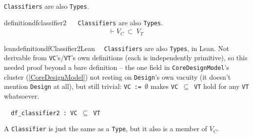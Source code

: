 \pn \texttt{Classifiers} are also \texttt{Types}.

\begin{restatable}{definition}{dfclassifier2} ~~  \texttt{Classifiers} are also \texttt{Types}.
\begin{align}
\vdash V_C~\subset~V_T~\label{eq:df-classifier2}\tag{df-classifier2}
\end{align}
\end{restatable}

\begin{restatable}{leandefinition}{dfClassifier2Lean}~~ \texttt{Classifiers} are also
\texttt{Types}, in Lean. Not derivable from \texttt{VC}'s/\texttt{VT}'s own definitions (each is
independently primitive), so this needed proof beyond a bare definition -- the one field in
\texttt{CoreDesignModel}'s cluster (\ref{CoreDesignModel}) not resting on \texttt{Design}'s own vacuity
(it doesn't mention \texttt{Design} at all), but still trivial: \texttt{VC := $\emptyset$} makes
\texttt{VC $\subseteq$ VT} hold for any \texttt{VT} whatsoever.

\texttt{~~df\_classifier2 : VC $\subseteq$ VT}
\label{df_classifier2}
\end{restatable}

\pn A \texttt{Classifier} is just the same as a \texttt{Type}, but it also is a member of $V_C$.


%
%
%
%
%
%
